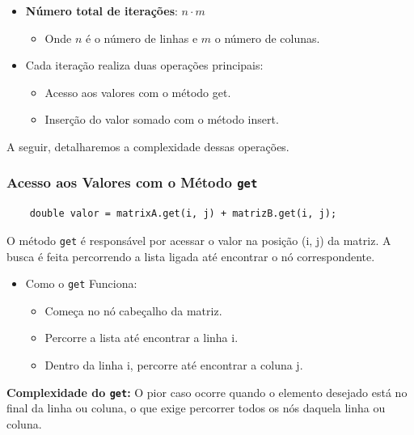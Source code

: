 \documentclass[12pt]{article}
\begin{document}
    \begin{itemize}
        \item \textbf{Número total de iterações}: \(n \cdot m\)
            \begin{itemize}
                \item Onde \(n\) é o número de linhas e \(m\) o número de colunas.
            \end{itemize}

            \item Cada iteração realiza duas operações principais:
                \begin{itemize}
                    \item Acesso aos valores com o método get.
                    \item Inserção do valor somado com o método insert.
                \end{itemize}
    \end{itemize}
A seguir, detalharemos a complexidade dessas operações.

    \subsubsection{Acesso aos Valores com o Método \texttt{get}}
\begin{lstlisting}
    double valor = matrixA.get(i, j) + matrizB.get(i, j);
\end{lstlisting}

O método \texttt{get} é responsável por acessar o valor na posição (i, j) da matriz. A busca é feita percorrendo a lista ligada até encontrar o nó correspondente.

\begin{itemize}
    \item Como o \texttt{get} Funciona:
        \begin{itemize}
            \item Começa no nó cabeçalho da matriz.
            \item Percorre a lista até encontrar a linha i.
            \item Dentro da linha i, percorre até encontrar a coluna j.
        \end{itemize}
\end{itemize}

\textbf{Complexidade do \texttt{get}:} 
    O pior caso ocorre quando o elemento desejado está no final da linha ou coluna, o que exige percorrer todos os nós daquela linha ou coluna.
\end{document}
